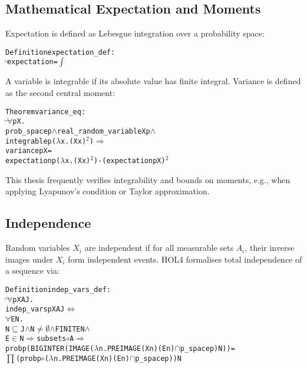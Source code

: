 \subsection{Mathematical Expectation and Moments}

Expectation is defined as Lebesgue integration over a probability space:

\begin{hol}
\begin{alltt}
Definition expectation\_def :
\(\!\!\!{\turn}\!\!\!\!\) expectation = \(\int\)
\end{alltt}
\end{hol}

A variable is integrable if its absolute value has finite integral. Variance is defined as the second central moment:

\begin{hol}
\begin{alltt}
Theorem variance\_eq :
\(\!\!\!{\turn}\!\!\!\!\) \(\forall\)p X.
prob\_space p \(\land\) real\_random\_variable X p \(\land\)
integrable p (\(\lambda\)x. (X x)\(^2\)) \(\Rightarrow\)
variance p X =
expectation p (\(\lambda\)x. (X x)\(^2\)) - (expectation p X)\(^2\)
\end{alltt}
\end{hol}

This thesis frequently verifies integrability and bounds on moments, e.g., when applying Lyapunov's condition or Taylor approximation.

\subsection{Independence}

Random variables $X_i$ are independent if for all measurable sets $A_i$, their inverse images under $X_i$ form independent events. HOL4 formalises total independence of a sequence via:

\begin{hol}
\begin{alltt}
Definition indep\_vars\_def :
\(\!\!\!{\turn}\!\!\!\!\) \(\forall\)p X A J.
indep\_vars p X A J \({\Leftrightarrow}\)
\(\forall\)E N.
  N \(\subseteq\) J \(\land\) N \(\ne\) \(\emptyset\) \(\land\) FINITE N \(\land\)
  E \(\in\) N \(\Rightarrow\) subsets \(\circ\) A \(\Rightarrow\)
  prob p (BIGINTER (IMAGE (\(\lambda\)n. PREIMAGE (X n) (E n) \(\cap\) p\_space p) N)) =
  \(\prod\) (prob p \(\circ\) (\(\lambda\)n. PREIMAGE (X n) (E n) \(\cap\) p\_space p)) N
\end{alltt}
\end{hol}

